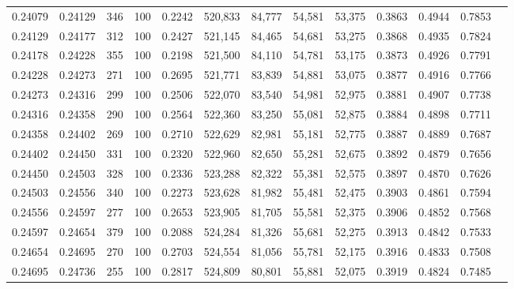 \begin{tabular}{rrrrrrrrrrrrr}
0.24079 & 0.24129 &   346 & 100 &                                     0.2242 & 520,833 &  84,777 &  54,581 &  53,375 & 0.3863 & 0.4944 & 0.7853 \\
0.24129 & 0.24177 &   312 & 100 &                                     0.2427 & 521,145 &  84,465 &  54,681 &  53,275 & 0.3868 & 0.4935 & 0.7824 \\
0.24178 & 0.24228 &   355 & 100 &                                     0.2198 & 521,500 &  84,110 &  54,781 &  53,175 & 0.3873 & 0.4926 & 0.7791 \\
0.24228 & 0.24273 &   271 & 100 &                                     0.2695 & 521,771 &  83,839 &  54,881 &  53,075 & 0.3877 & 0.4916 & 0.7766 \\
0.24273 & 0.24316 &   299 & 100 &                                     0.2506 & 522,070 &  83,540 &  54,981 &  52,975 & 0.3881 & 0.4907 & 0.7738 \\
0.24316 & 0.24358 &   290 & 100 &                                     0.2564 & 522,360 &  83,250 &  55,081 &  52,875 & 0.3884 & 0.4898 & 0.7711 \\
0.24358 & 0.24402 &   269 & 100 &                                     0.2710 & 522,629 &  82,981 &  55,181 &  52,775 & 0.3887 & 0.4889 & 0.7687 \\
0.24402 & 0.24450 &   331 & 100 &                                     0.2320 & 522,960 &  82,650 &  55,281 &  52,675 & 0.3892 & 0.4879 & 0.7656 \\
0.24450 & 0.24503 &   328 & 100 &                                     0.2336 & 523,288 &  82,322 &  55,381 &  52,575 & 0.3897 & 0.4870 & 0.7626 \\
0.24503 & 0.24556 &   340 & 100 &                                     0.2273 & 523,628 &  81,982 &  55,481 &  52,475 & 0.3903 & 0.4861 & 0.7594 \\
0.24556 & 0.24597 &   277 & 100 &                                     0.2653 & 523,905 &  81,705 &  55,581 &  52,375 & 0.3906 & 0.4852 & 0.7568 \\
0.24597 & 0.24654 &   379 & 100 &                                     0.2088 & 524,284 &  81,326 &  55,681 &  52,275 & 0.3913 & 0.4842 & 0.7533 \\
0.24654 & 0.24695 &   270 & 100 &                                     0.2703 & 524,554 &  81,056 &  55,781 &  52,175 & 0.3916 & 0.4833 & 0.7508 \\
0.24695 & 0.24736 &   255 & 100 &                                     0.2817 & 524,809 &  80,801 &  55,881 &  52,075 & 0.3919 & 0.4824 & 0.7485 \\

\end{tabular}
